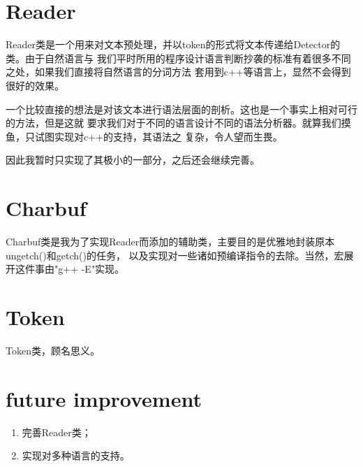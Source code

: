 \section{Reader}

Reader类是一个用来对文本预处理，并以token的形式将文本传递给Detector的类。由于自然语言与
我们平时所用的程序设计语言判断抄袭的标准有着很多不同之处，如果我们直接将自然语言的分词方法
套用到c++等语言上，显然不会得到很好的效果。

一个比较直接的想法是对该文本进行语法层面的剖析。这也是一个事实上相对可行的方法，但是这就
要求我们对于不同的语言设计不同的语法分析器。就算我们摸鱼，只试图实现对c++的支持，其语法之
复杂，令人望而生畏。

因此我暂时只实现了其极小的一部分，之后还会继续完善。

\section{Charbuf}

Charbuf类是我为了实现Reader而添加的辅助类，主要目的是优雅地封装原本ungetch()和getch()的任务，
以及实现对一些诸如预编译指令的去除。当然，宏展开这件事由"g++ -E"实现。

\section{Token}

Token类，顾名思义。

\section{future improvement}
\begin{enumerate}
    \item 完善Reader类；
    \item 实现对多种语言的支持。
\end{enumerate}

